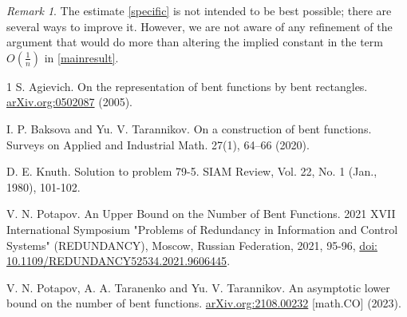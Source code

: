 \documentclass{article}
\theoremstyle{definition}
\theoremstyle{remark}
\newtheorem*{remark}{Remark}
\theoremstyle{definition}
\begin{document}
\begin{remark}
The estimate \eqref{specific} is not intended to be best possible; there are several ways to improve it. However, we are not aware of any refinement of the argument that would do more than altering the implied constant in the term $O\left( \frac{1}{n} \right)$ in \eqref{mainresult}.
\end{remark}

\begin{thebibliography}{1}
S. Agievich. On the representation of bent functions by bent rectangles. \href{https://arxiv.org/pdf/math/0502087}{arXiv.org:0502087} (2005).

I. P. Baksova and Yu. V. Tarannikov. On a construction of bent functions. Surveys on Applied and Industrial Math. 27(1), 64–66 (2020).

D. E. Knuth. Solution to problem 79-5. SIAM Review, Vol. 22, No. 1 (Jan., 1980), 101-102.

V. N. Potapov. An Upper Bound on the Number of Bent Functions. 2021 XVII International Symposium "Problems of Redundancy in Information and Control Systems" (REDUNDANCY), Moscow, Russian Federation, 2021, 95-96, \href{https://doi.org/10.1109/REDUNDANCY52534.2021.9606445}{doi: 10.1109/REDUNDANCY52534.2021.9606445}.

V. N. Potapov, A. A. Taranenko and Yu. V. Tarannikov. An asymptotic lower bound on the number of bent functions. \href{https://arxiv.org/abs/2108.00232}{arXiv.org:2108.00232} [math.CO] (2023).
\end{thebibliography}
\end{document}

